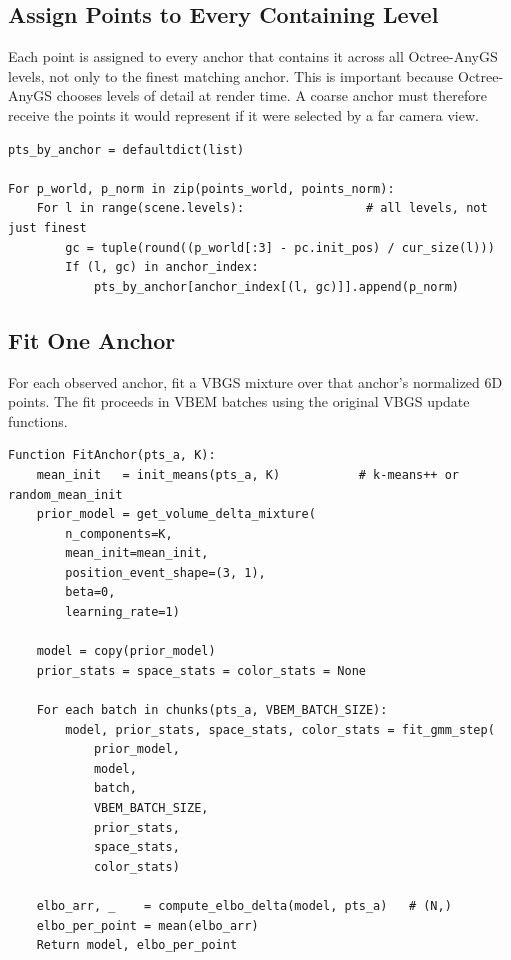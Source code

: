 \documentclass[11pt]{article}
\begin{document}
\subsection{Assign Points to Every Containing Level}

Each point is assigned to every anchor that contains it across all Octree-AnyGS
levels, not only to the finest matching anchor. This is important because
Octree-AnyGS chooses levels of detail at render time. A coarse anchor must
therefore receive the points it would represent if it were selected by a far
camera view.

\begin{lstlisting}
pts_by_anchor = defaultdict(list)

For p_world, p_norm in zip(points_world, points_norm):
    For l in range(scene.levels):                 # all levels, not just finest
        gc = tuple(round((p_world[:3] - pc.init_pos) / cur_size(l)))
        If (l, gc) in anchor_index:
            pts_by_anchor[anchor_index[(l, gc)]].append(p_norm)
\end{lstlisting}

\subsection{Fit One Anchor}

For each observed anchor, fit a VBGS mixture over that anchor's normalized 6D
points. The fit proceeds in VBEM batches using the original VBGS update
functions.

\begin{lstlisting}
Function FitAnchor(pts_a, K):
    mean_init   = init_means(pts_a, K)           # k-means++ or random_mean_init
    prior_model = get_volume_delta_mixture(
        n_components=K,
        mean_init=mean_init,
        position_event_shape=(3, 1),
        beta=0,
        learning_rate=1)

    model = copy(prior_model)
    prior_stats = space_stats = color_stats = None

    For each batch in chunks(pts_a, VBEM_BATCH_SIZE):
        model, prior_stats, space_stats, color_stats = fit_gmm_step(
            prior_model,
            model,
            batch,
            VBEM_BATCH_SIZE,
            prior_stats,
            space_stats,
            color_stats)

    elbo_arr, _    = compute_elbo_delta(model, pts_a)   # (N,)
    elbo_per_point = mean(elbo_arr)
    Return model, elbo_per_point
\end{lstlisting}
\end{document}
